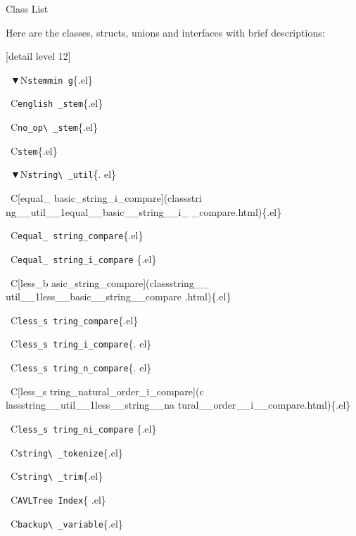 Class List











Here are the classes, structs, unions and interfaces with brief descriptions\+:







[detail level 12]





  ▼N{\tt stemmin g}\{.el\}

  C{\tt english \+\_\+stem}\{.el\}

  C{\tt no\+\_\+op\textbackslash{} \+\_\+stem}\{.el\}

  C{\tt stem}\{.el\}

  ▼N{\tt string\textbackslash{} \+\_\+util}\{. el\}

  C[equal\+\_\+ basic\+\_\+string\+\_\+i\+\_\+compare](classstri ng\+\_\+\+\_\+util\+\_\+\_\+1equal\+\_\+\+\_\+basic\+\_\+\+\_\+string\+\_\+\+\_\+i\+\_\+ \+\_\+compare.\+html)\{.el\}

  C{\tt equal\+\_\+ string\+\_\+compare}\{.el\}

  C{\tt equal\+\_\+ string\+\_\+i\+\_\+compare} \{.el\}

  C[less\+\_\+b asic\+\_\+string\+\_\+compare](classstring\+\_\+\+\_\+ util\+\_\+\_\+1less\+\_\+\+\_\+basic\+\_\+\+\_\+string\+\_\+\+\_\+compare .html)\{.el\}

  C{\tt less\+\_\+s tring\+\_\+compare}\{.el\}

  C{\tt less\+\_\+s tring\+\_\+i\+\_\+compare}\{. el\}

  C{\tt less\+\_\+s tring\+\_\+n\+\_\+compare}\{. el\}

  C[less\+\_\+s tring\+\_\+natural\+\_\+order\+\_\+i\+\_\+compare](c lassstring\+\_\+\+\_\+util\+\_\+\_\+1less\+\_\+\+\_\+string\+\_\+\+\_\+na tural\+\_\+\+\_\+order\+\_\+\+\_\+i\+\_\+\+\_\+compare.\+html)\{.el\}

  C{\tt less\+\_\+s tring\+\_\+ni\+\_\+compare} \{.el\}

  C{\tt string\textbackslash{} \+\_\+tokenize}\{.el\}

  C{\tt string\textbackslash{} \+\_\+trim}\{.el\}

  C{\tt A\+V\+L\+Tree Index}\{ .el\}

  C{\tt backup\textbackslash{} \+\_\+variable}\{.el\}

